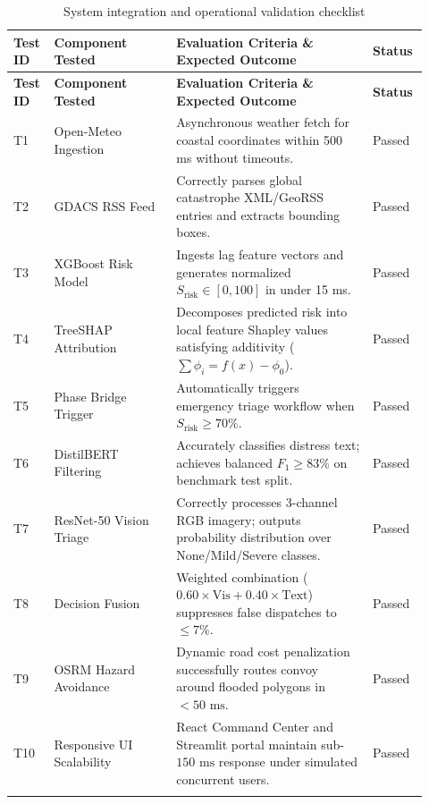\documentclass{article}
\begin{document}
\begin{longtable}{p{0.07\linewidth} p{0.28\linewidth} p{0.45\linewidth} p{0.12\linewidth}}
\caption{System integration and operational validation checklist}\\
\toprule
\textbf{Test ID} & \textbf{Component Tested} & \textbf{Evaluation Criteria \& Expected Outcome} & \textbf{Status}\\
\midrule
\endfirsthead
\toprule
\textbf{Test ID} & \textbf{Component Tested} & \textbf{Evaluation Criteria \& Expected Outcome} & \textbf{Status}\\
\midrule
\endhead
T1 & Open-Meteo Ingestion & Asynchronous weather fetch for coastal coordinates within 500 ms without timeouts. & Passed\\
T2 & GDACS RSS Feed & Correctly parses global catastrophe XML/GeoRSS entries and extracts bounding boxes. & Passed\\
T3 & XGBoost Risk Model & Ingests lag feature vectors and generates normalized $S_{\text{risk}} \in [0, 100]$ in under 15 ms. & Passed\\
T4 & TreeSHAP Attribution & Decomposes predicted risk into local feature Shapley values satisfying additivity ($\sum \phi_i = f(x) - \phi_0$). & Passed\\
T5 & Phase Bridge Trigger & Automatically triggers emergency triage workflow when $S_{\text{risk}} \ge 70\%$. & Passed\\
T6 & DistilBERT Filtering & Accurately classifies distress text; achieves balanced $F_1 \ge 83\%$ on benchmark test split. & Passed\\
T7 & ResNet-50 Vision Triage & Correctly processes 3-channel RGB imagery; outputs probability distribution over None/Mild/Severe classes. & Passed\\
T8 & Decision Fusion & Weighted combination ($0.60 \times \text{Vis} + 0.40 \times \text{Text}$) suppresses false dispatches to $\le 7\%$. & Passed\\
T9 & OSRM Hazard Avoidance & Dynamic road cost penalization successfully routes convoy around flooded polygons in $< 50\text{ ms}$. & Passed\\
T10 & Responsive UI Scalability & React Command Center and Streamlit portal maintain sub-$150\text{ ms}$ response under simulated concurrent users. & Passed\\
\bottomrule
\label{tab:testing_matrix}
\end{longtable}

\end{document}
